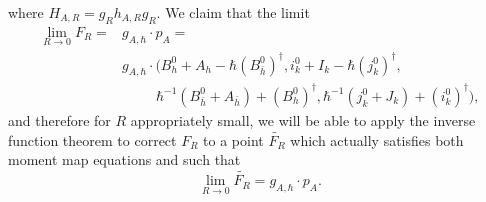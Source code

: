 \documentclass[12pt,oneside,reqno]{amsart}
\theoremstyle{definition}
\numberwithin{equation}{section}
\numberwithin{theorem}{section}
\renewcommand{\d}[1]{\ensuremath{\operatorname{d}\!{#1}}}
\renewcommand{\d}{\dagger}
\begin{document}
%
where $H_{A,R} = g_Rh_{A,R}g_R$. We claim that the limit 
%
\begin{equation}
\begin{split}
\lim\limits_{R\to 0} F_R = &g_{A,\hbar}\cdot p_A = \\&g_{A,\hbar}\cdot(B_h^0+A_h-\hbar(B_{\bar{h}}^0)^\d,i_k^0+I_k-{\hbar}(j_k^0)^\d,\\
&~~~~~~~~~~~{\hbar}^{-1}(B_{\bar{h}}^0+A_{\bar{h}})+(B_h^0)^\d,\hbar^{-1}(j_k^0+J_k)+(i_k^0)^\d),
\end{split}
\end{equation}
%
and therefore for $R$ appropriately small, we will be able to apply the inverse function theorem to correct $F_R$ to a point $\widetilde{F_R}$ which actually satisfies both moment map equations and such that 
%
\begin{equation*}
\lim\limits_{R\to 0}\widetilde{F_R} = g_{A,\hbar}\cdot p_A.
\end{equation*}
%
\end{document}
